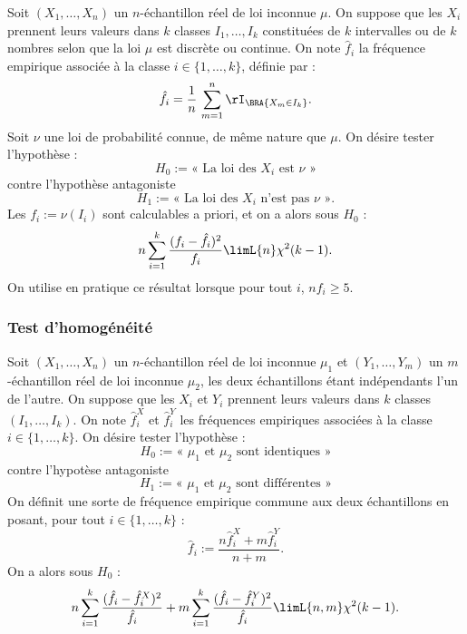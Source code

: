 Soit $(X_1,\ldots,X_n)$ un $n$-échantillon réel de loi inconnue $\mu$. On
suppose que les $X_i$ prennent leurs valeurs dans $k$ classes $I_1,\ldots,I_k$
constituées de $k$ intervalles ou de $k$ nombres selon que la loi $\mu$ est
discrète ou continue. On note $\hat f_i$ la fréquence empirique associée à la
classe $i\in\{1,\ldots,k\}$, définie par :
\begin{equation*}
  \hat f_i=\frac{1}{n}\,\sum_{m=1}^n \rI_\BRA{X_m \in I_k}.
\end{equation*}
Soit $\nu$ une loi de probabilité connue, de même nature que $\mu$. On désire
tester l'hypothèse :
$$
H_0:=\text{« La loi des } X_i \text{ est } \nu \text{ »} 
$$
contre l'hypothèse antagoniste 
$$
H_1:=\text{« La loi des } X_i \text{ n'est pas } \nu \text{ »}.
$$
Les $f_i:=\nu(I_i)$ sont calculables a priori, et on a alors sous $H_0$ :
\begin{equation*}
  n\sum_{i=1}^k \frac{(f_i-\hat f_i)^2}{f_i} \limL{n} \chi^2(k-1).
\end{equation*}
On utilise en pratique ce résultat lorsque pour tout $i$, $n f_i \geq 5$.

\subsubsection{Test d'homogénéité} 

Soit $(X_1,\ldots,X_n)$ un $n$-échantillon réel de loi inconnue $\mu_1$ et
$(Y_1,\ldots,Y_m)$ un $m$-échantillon réel de loi inconnue $\mu_2$, les deux
échantillons étant indépendants l'un de l'autre. On suppose que les $X_i$ et
$Y_i$ prennent leurs valeurs dans $k$ classes $(I_1,\ldots,I_k)$. On note
$\hat f^X_i$ et $\hat f^Y_i$ les fréquences empiriques associées à la classe
$i\in\{1,\ldots,k\}$. On désire tester l'hypothèse :
$$
H_0:=\text{« } \mu_1 \text{ et } \mu_2 \text{ sont identiques »}
$$
contre l'hypotèse antagoniste
$$
H_1:=\text{« } \mu_1 \text{ et } \mu_2 \text{ sont différentes »}
$$
On définit une sorte de fréquence empirique commune aux deux échantillons
en posant, pour tout $i\in\{1,\ldots,k\}$ :
\begin{equation*}
  \hat f_i := \frac{n\hat f^X_i + m\hat f^Y_i}{n+m}.
\end{equation*}
On a alors sous $H_0$ :
\begin{equation*}
  n\sum_{i=1}^k \frac{(\hat f_i-\hat f^X_i)^2}{\hat f_i}
 +m\sum_{i=1}^k \frac{(\hat f_i-\hat f^Y_i)^2}{\hat f_i} 
 \limL{n,m} \chi^2(k-1).
\end{equation*}

